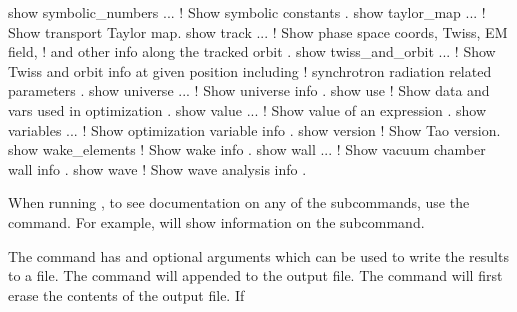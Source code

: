{{{{{{{\begin{example}
  show symbolic_numbers ...    ! Show symbolic constants .
  show taylor_map ...          ! Show transport Taylor map.
  show track ...               ! Show phase space coords, Twiss, EM field, 
                               !   and other info along the tracked orbit .
  show twiss_and_orbit ...     ! Show Twiss and orbit info at given position including
                               !   synchrotron radiation related parameters .
  show universe ...            ! Show universe info .
  show use                     ! Show data and vars used in optimization .
  show value ...               ! Show value of an expression .
  show variables ...           ! Show optimization variable info .
  show version                 ! Show Tao version.
  show wake_elements           ! Show wake info .
  show wall ...                ! Show vacuum chamber wall info .
  show wave                    ! Show wave analysis info .
\end{example}

\vskip 10pt 

When running \tao, to see documentation on any of the subcommands, use the  command. For example,  will show information on the  subcommand.

The  command has  and  optional arguments which can be used to write
the results to a file.  The  command will appended to the output file. The  command will first erase the contents of the output file. If \vn{global%
\vn{*} character in it, a three digit number is substituted for the \vn{*}. The value of the number
starts at \vn{001} and increases by 1 each time \vn{show -write} is used.  Example:
\begin{example}
  show -write floor.dat lat -floor  ! Write floor positions to the file "floor.dat".
\end{example}

The \vn{-noprint} option suppresses printing and is useful when writing large amounts of data to a
file.

When writing to a file, if there are any error messages (for example, that something could not be
computed), the error messages are reproduced in the file. If this behavior is not wanted, the
\vn{-no_err_out} switch may be used to block the error messages being written.

}}}}}}}}
